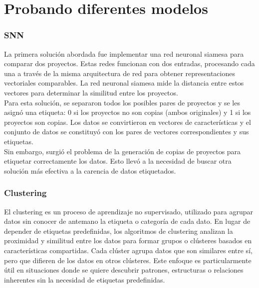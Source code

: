 \section{Probando diferentes modelos}

\subsubsection{SNN}
La primera solución abordada fue implementar una red neuronal siamesa para comparar dos proyectos. Estas redes funcionan con dos entradas, procesando cada una a través de la misma arquitectura de red para obtener representaciones vectoriales comparables. La red neuronal siamesa mide la distancia entre estos vectores para determinar la similitud entre los proyectos.\\

Para esta solución, se separaron todos los posibles pares de proyectos y se les asignó una etiqueta: 0 si los proyectos no son copias (ambos originales) y 1 si los proyectos son copias. Los datos se convirtieron en vectores de características y el conjunto de datos se constituyó con los pares de vectores correspondientes y sus etiquetas.\\

Sin embargo, surgió el problema de la generación de copias de proyectos para etiquetar correctamente los datos. Esto llevó a la necesidad de buscar otra solución más efectiva a la carencia de datos etiquetados.


\subsubsection{Clustering}

El clustering es un proceso de aprendizaje no supervisado, utilizado para agrupar datos sin conocer de antemano la etiqueta o categoría de cada dato. En lugar de depender de etiquetas predefinidas, los algoritmos de clustering analizan la proximidad y similitud entre los datos para formar grupos o clústeres basados en características compartidas. Cada clúster agrupa datos que son similares entre sí, pero que difieren de los datos en otros clústeres. Este enfoque es particularmente útil en situaciones donde se quiere descubrir patrones, estructuras o relaciones inherentes sin la necesidad de etiquetas predefinidas.

